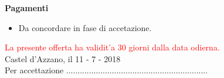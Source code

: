 \documentclass[a4paper]{article}
\begin{document}
                      \noindent\textbf{Pagamenti}
                      \begin{itemize}
                          \item Da concordare in fase di accetazione.
                      \end{itemize}
                      
                      \textcolor{red}{La presente offerta ha validit'a 30 giorni dalla data odierna.}\\
                      
                      Castel d'Azzano, il 11 - 7 - 2018
                      \vspace{1cm}\\
                      Per accettazione ..............................................................
                    
                    
\end{document}
